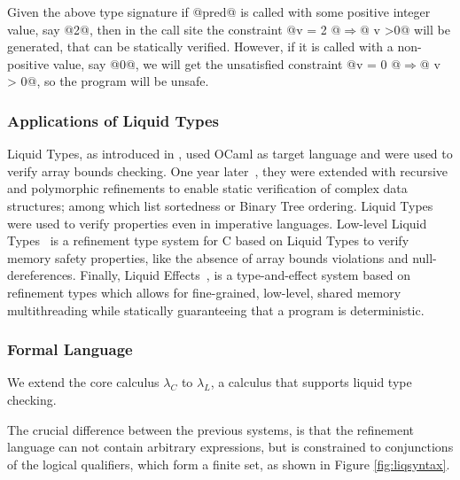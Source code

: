 Given the above type signature 
if @pred@ is called with some positive integer value, say @2@,
then in the call site the constraint @v = 2 @$\Rightarrow$@ v >0@ will be generated, 
that can be statically verified.
%
However, if it is called with a non-positive value, 
say @0@, we will get the unsatisfied constraint
@v = 0 @$\Rightarrow$@ v > 0@, 
so the program will be unsafe.

\subsubsection{Applications of Liquid Types}
Liquid Types, as introduced in \cite{LiquidPLDI08}, used OCaml as target language
and were used to verify array bounds checking.
One year later~\cite{LiquidPLDI09}, they were extended with recursive and polymorphic refinements
to enable static verification of complex data structures; among which 
list sortedness or Binary Tree ordering.
%
Liquid Types were used to verify properties even in imperative languages.
Low-level Liquid Types~\cite{Rondon10} is a refinement type system for
C based on Liquid Types to verify memory safety properties, 
like the absence of array bounds violations
and null-dereferences.
Finally, Liquid Effects~\cite{Kawaguchi12},
is a type-and-effect system based on refinement types
which allows for fine-grained, low-level, shared memory multithreading while statically guaranteeing that a program is deterministic. 

\subsubsection{Formal Language}
We extend the core calculus $\lambda_C$ to $\lambda_L$, 
a calculus that supports liquid type checking.

The crucial difference between the previous systems, is that 
the refinement language 
can not contain arbitrary expressions, but 
is constrained
to conjunctions of the logical qualifiers, which form a finite set, 
as shown in Figure \ref{fig:liqsyntax}.


